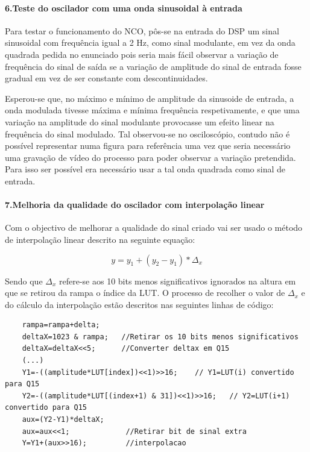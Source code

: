 \documentclass[11pt]{article}
\numberwithin{equation}{section}
\begin{document}
\paragraph{6.Teste do oscilador com uma onda sinusoidal à entrada} \label{para:P1-6} \hspace{0pt}

Para testar o funcionamento do NCO, pôs-se na entrada do DSP um sinal sinusoidal com frequência igual a 2 Hz, como sinal modulante, em vez da onda quadrada pedida no enunciado pois seria mais fácil observar a variação de frequência do sinal de saída se a variação de amplitude do sinal de entrada fosse gradual em vez de ser constante com descontinuidades. 
\vspace{1 mm}

Esperou-se que, no máximo e mínimo de amplitude da sinusoide de entrada, a onda modulada tivesse máxima e mínima frequência respetivamente, e que uma variação na amplitude do sinal modulante provocasse um efeito linear na frequência do sinal modulado. Tal observou-se no osciloscópio, contudo não é possível representar numa figura para referência uma vez que seria necessário uma gravação de vídeo do processo para poder observar a variação pretendida. Para isso ser possível era necessário usar a tal onda quadrada como sinal de entrada.

\paragraph{7.Melhoria da qualidade do oscilador com interpolação linear} \hspace{0pt}

Com o objectivo de melhorar a qualidade do sinal criado vai ser usado o método de interpolação linear descrito na seguinte equação:

\begin{equation}
y=y_{1}+(y_{2}-y_{1})*\Delta_{x}
\end{equation}

Sendo que $ \Delta_{x} $ refere-se aos 10 bits menos significativos ignorados na altura em que se retirou da rampa o índice da LUT. O processo de recolher o valor de $ \Delta_{x} $ e do cálculo da interpolação estão descritos nas seguintes linhas de código:
\begin{lstlisting}
	rampa=rampa+delta;
	deltaX=1023 & rampa;   //Retirar os 10 bits menos significativos
	deltaX=deltaX<<5;      //Converter deltax em Q15
	(...)
	Y1=-((amplitude*LUT[index])<<1)>>16;	// Y1=LUT(i) convertido para Q15
	Y2=-((amplitude*LUT[(index+1) & 31])<<1)>>16;	// Y2=LUT(i+1) convertido para Q15
	aux=(Y2-Y1)*deltaX;		
	aux=aux<<1;				//Retirar bit de sinal extra
	Y=Y1+(aux>>16);			//interpolacao	
\end{lstlisting}
\end{document}
